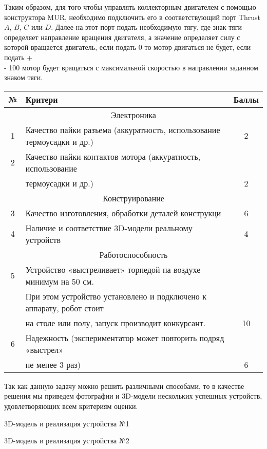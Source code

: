 Таким образом, для того чтобы управлять коллекторным двигателем с помощью конструктора MUR, необходимо подключить его в соответствующий порт Thrust $A$, $B$, $C$ или $D$. Далее на этот порт подать необходимую тягу, где знак тяги определяет направление вращения двигателя, а значение определяет силу с которой вращается двигатель, если подать 0 то мотор двигаться не будет, если подать +\\- 100 мотор будет вращаться с максимальной скоростью в направлении заданном знаком тяги.

\markSection

\begin{table}[H]
    \center
    \small
    \begin{tabular}{|c|l|c|}
        \hline
        № & Критери & Баллы  \\
        \hline
        \multicolumn{3}{|c|}{Электроника} \\
        \hline
        1 & Качество пайки разъема (аккуратность, использование термоусадки и др.) & 2 \\
        \hline
        2 & Качество пайки контактов мотора (аккуратность, использование & \\
          & термоусадки и др.) & 2 \\
        \hline
        \multicolumn{3}{|c|}{Конструирование} \\
        \hline
        3 & Качество изготовления, обработки деталей конструкци & 6 \\
        \hline
        4 & Наличие и соответствие 3D-модели реальному устройств & 4 \\
        \hline
        \multicolumn{3}{|c|}{Работоспособность} \\
        \hline
        5 & Устройство «выстреливает» торпедой на воздухе минимум на 50 см. & \\
          & При этом устройство установлено и подключено к аппарату, робот стоит & \\
          & на столе или полу, запуск производит конкурсант.  & 10 \\
        \hline
        6 & Надежность (экспериментатор может повторить подряд «выстрел»& \\
          & не менее 3 раз) & 6 \\
        \hline
    \end{tabular}
\end{table}

\solutionSection

Так как данную задачу можно решить различными способами, то в качестве решения мы приведем фотографии и 3D-модели нескольких успешных устройств, удовлетворяющих всем критериям оценки.


\begin{center}
    3D-модель и реализация устройства №1
\end{center}


\begin{center}
    3D-модель и реализация устройства №2
\end{center}